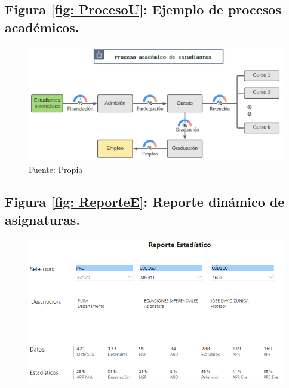 \documentclass[12pt,jou]{apa7}
\begin{document}
\subsection{Figura \ref{fig: ProcesoU}: Ejemplo de procesos académicos.}
\begin{figure}[h] \label{ProcesoU}
\centering
\includegraphics[width=1\linewidth]{Figuras/ProcesoU}
\caption*{ Fuente: Propia}
\end{figure}

\subsection{Figura \ref{fig: ReporteE}: Reporte dinámico de asignaturas.}
\begin{figure}[h] \label{ReporteE}
\centering
\includegraphics[width=0.92\linewidth]{Figuras/ReporteE}
\end{figure}

\end{document}
